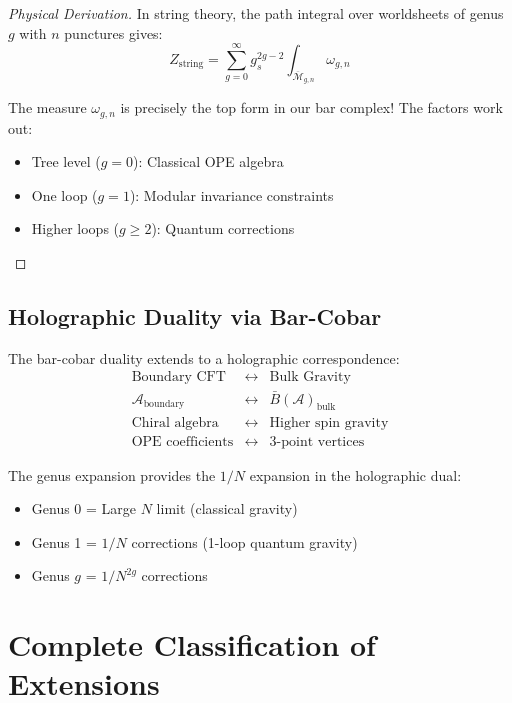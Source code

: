 \begin{proof}[Physical Derivation]
In string theory, the path integral over worldsheets of genus $g$ with $n$ punctures gives:
\[
Z_{\text{string}} = \sum_{g=0}^\infty g_s^{2g-2} \int_{\overline{\mathcal{M}}_{g,n}} \omega_{g,n}
\]

The measure $\omega_{g,n}$ is precisely the top form in our bar complex! The factors work out:
\begin{itemize}
\item Tree level ($g=0$): Classical OPE algebra
\item One loop ($g=1$): Modular invariance constraints
\item Higher loops ($g \geq 2$): Quantum corrections
\end{itemize}
\end{proof}

\subsection{Holographic Duality via Bar-Cobar}

\begin{theorem}
The bar-cobar duality extends to a holographic correspondence:
\[
\begin{array}{ccc}
\text{Boundary CFT} & \leftrightarrow & \text{Bulk Gravity} \\
\mathcal{A}_{\text{boundary}} & \leftrightarrow & \bar{B}(\mathcal{A})_{\text{bulk}} \\
\text{Chiral algebra} & \leftrightarrow & \text{Higher spin gravity} \\
\text{OPE coefficients} & \leftrightarrow & \text{3-point vertices}
\end{array}
\]
\end{theorem}

The genus expansion provides the $1/N$ expansion in the holographic dual:
\begin{itemize}
\item Genus 0 = Large $N$ limit (classical gravity)
\item Genus 1 = $1/N$ corrections (1-loop quantum gravity)
\item Genus $g$ = $1/N^{2g}$ corrections
\end{itemize}

\section{Complete Classification of Extensions}


